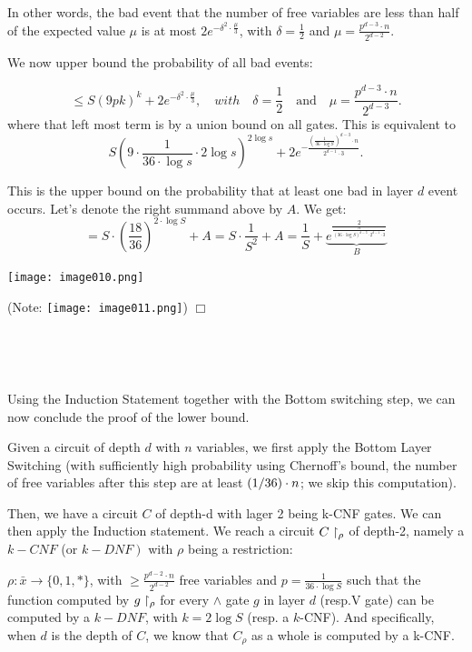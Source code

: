  In other words, the bad event that the number of free variables are less than half of the expected value $\mu$ is at most $
2e^{-\delta^2 \cdot \frac{\mu}{3}}$, with $\delta = \frac{1}{2}$ and  $\mu = \frac{p^{d-3} \cdot n}{2^{d-2}}.$

We now upper bound the probability of all bad events:

\[
\leq S(9pk)^k + 2e^{-\delta^2 \cdot \frac{\mu}{3}}, \quad with \quad \delta = \frac{1}{2} \quad \text{and} \quad \mu = \frac{p^{d-3} \cdot n}{2^{d-3}}.
\]
where that left most term is by a union bound on all gates.
This is equivalent to 
\[
S \left( 9 \cdot \frac{1}{36 \cdot \log s} \cdot 2 \log s \right)^{2 \log s} + 
2 e^{-\frac{\left(\frac{1}{36 \cdot \log S }\right)^{d-3} \cdot n}{2^{d-1} \cdot 3}}.
\]

This is the upper bound on the probability that at least one bad in layer $d$ event occurs.
Let's denote the right summand above by $A$. 
We get:
$$
=S \cdot\left(\frac{18}{36}\right)^{2 \cdot \log S}+A =S \cdot \frac{1}{S^2}+A =
\frac{1}{S}+
\underbrace{
    e^{
        \frac{2}{
        \frac{n}{{(36 \cdot \log S)^{d-3} \cdot 2^{d-1} \cdot 3}}}}
}_B
$$


\texttt{[image: image010.png]}



(Note: \texttt{[image: image011.png]})
$\Box$

\

\

Using the Induction Statement together with the Bottom switching step,
we can now conclude the proof of the lower bound.

Given a circuit of depth $d$ with $n$ variables,
we first apply the Bottom Layer Switching (with sufficiently high probability using Chernoff's bound, the number of free variables after this step
are at least $(1/36)\cdot n$; we skip this computation).

Then, we have a circuit $C$ of depth-d with lager 2 being k-CNF gates. We can then apply the Induction statement. We reach a circuit $C \upharpoonright_\rho$ of depth-2, namely a $k-C N F$ (or $\left.k-D N F\right)$ with
$\rho$ being a restriction:


$\rho: \bar{x} \rightarrow\{0,1, *\}$, with $\geqslant \frac{p^{d-2} \cdot n}{2^{d-2}}$ free variables and $p=\frac{1}{36 \cdot \log S}$ such that the function computed by $g\upharpoonright_\rho$ for every $\land$ gate $g$ in layer $d$ (resp.V gate) can be computed by a $k-D N F$, with $k=2 \log S$ (resp. a $k$-CNF).
And specifically, when $d$ is the depth of $C$, we know that $C_\rho$ as a whole is computed by a k-CNF.

